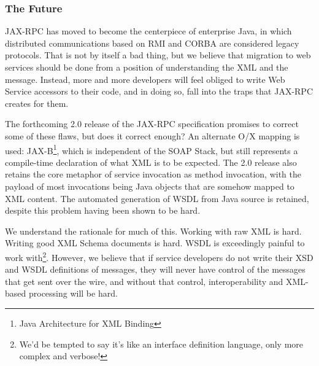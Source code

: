 \subsubsection{The Future}
\label{objections:implications:future}

JAX-RPC has moved to become the centerpiece of enterprise Java, in
which distributed communications based on RMI and CORBA are considered
legacy protocols. That is not by itself a bad thing, but we believe
that migration to web services should be done from a position of
understanding the XML and the message. Instead, more and more
developers will feel obliged to write Web Service accessors to their
code, and in doing so, fall into the traps that JAX-RPC creates for
them.

The forthcoming 2.0 release of the JAX-RPC specification promises to
correct some of these flaws, but does it correct enough? An alternate
O/X mapping is used: JAX-B\footnote{Java Architecture for XML
Binding}, which is independent of the SOAP Stack, but still represents
a compile-time declaration of what XML is to be expected. The 2.0
release also retains the core metaphor of service invocation as method
invocation, with the payload of most invocations being Java objects
that are somehow mapped to XML content. The automated generation of
WSDL from Java source is retained, despite this problem having been
shown to be hard.

We understand the rationale for much of this. Working with raw XML is
hard.  Writing good XML Schema documents is hard. WSDL is exceedingly
painful to work with\footnote{We'd be tempted to say it's like an
interface definition language, only more complex and
verbose!}. However, we believe that if service developers do not write
their XSD and WSDL definitions of messages, they will never have
control of the messages that get sent over the wire, and without that
control, interoperability and XML-based processing will be hard.

